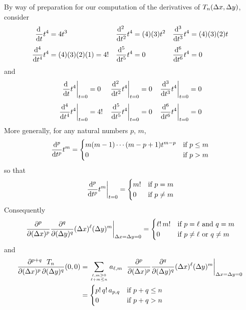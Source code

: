 By way of preparation for our computation of the derivatives of 
$T_n(\Delta x,\Delta y)$, consider
\begin{align*}
\diff{}{t}t^4&=4t^3 &
\difftwo{}{t}t^4&=(4)(3)t^2 &
\frac{\dee{}^3}{\dee{t}^3}t^4&=(4)(3)(2)t \\[0.05in]
\frac{\dee{}^4}{\dee{t}^4}t^4&=(4)(3)(2)(1)=4! &
\frac{\dee{}^5}{\dee{t}^5}t^4&=0 &
\frac{\dee{}^6}{\dee{t}^6}t^4&=0 
\end{align*}
and
\begin{align*}
\left.\diff{}{t}t^4\right|_{t=0}&=0 &
\left.\difftwo{}{t}t^4\right|_{t=0}&=0 &
\left.\frac{\dee{}^3}{\dee{t}^3}t^4\right|_{t=0}&=0 \\[0.05in]
\left.\frac{\dee{}^4}{\dee{t}^4}t^4\right|_{t=0}&=4! &
\left.\frac{\dee{}^5}{\dee{t}^5}t^4\right|_{t=0}&=0 &
\left.\frac{\dee{}^6}{\dee{t}^6}t^4\right|_{t=0}&=0 
\end{align*}
More generally, for any natural numbers $p$, $m$,
\begin{equation*}
\frac{\mathrm{d}^p}{\mathrm{d}t^p} t^m =
   \begin{cases}
      m(m-1)\cdots(m-p+1) t^{m-p} &\text {if $p\le m$} \\
      0 &\text{if $p>m$}
   \end{cases} 
\end{equation*}
so that
\begin{equation*}
\left.\frac{\mathrm{d}^p}{\mathrm{d}t^p} t^m\right|_{t=0} =
   \begin{cases}
      m! &\text {if $p = m$} \\
      0 &\text{if $p\ne m$}
   \end{cases} 
\end{equation*}
Consequently
\begin{equation*}
\left.\frac{\partial^p}{\partial (\Delta x)^p}\frac{\partial^q}{\partial (\Delta y)^q}
            (\Delta x)^\ell (\Delta y)^m\right|_{\Delta x=\Delta y=0}
=\begin{cases}
      \ell!\,m! &\text {if $p = \ell$ and $q=m$}  \\
      0 &\text{if $p\ne\ell$ or $q\ne m$}
   \end{cases} 
\end{equation*}
and
\begin{align*}
\frac{\partial^{p+q}\ \ T_n}{\partial (\De x)^p\, \partial (\De y)^q}(0,0)
&=\sum_{\Atop{\ell,m\ge 0}{\ell+m\le n}}  a_{\ell,m}\  
\left.\frac{\partial^p}{\partial (\De x)^p}\frac{\partial^q}{\partial (\De y)^q}
            (\De x)^\ell (\De y)^m\right|_{\De x=\De y=0} \\
&=\begin{cases}
      p!\,q!\,a_{p,q} &\text {if $p+q\le n$}  \\
      0 &\text{if $p+q > n$}
   \end{cases} 
\end{align*}
